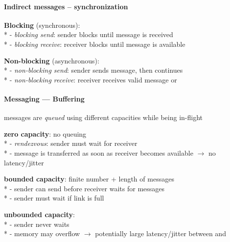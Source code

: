\paragraph{Indirect messages -- synchronization}
\begin{items}
  \item \textbf{Blocking} (synchronous): \\*
    - \emph{blocking send}: sender blocks until message is received \\*
    - \emph{blocking receive}: receiver blocks until message is available
  \item \textbf{Non-blocking} (asynchronous): \\*
    - \emph{non-blocking send}: sender sends message, then continues \\*
    - \emph{non-blocking receive}: receiver receives valid message or 
\end{items}

\paragraph{Messaging --- Buffering}
\begin{items}
  \item messages are \emph{queued} using different capacities while being in-flight
  \item \textbf{zero capacity}: no queuing \\*
    - \emph{rendezvous}: sender must wait for receiver \\*
    - message is transferred as soon as receiver becomes available \( \to \) no latency/jitter
  \item \textbf{bounded capacity}: finite number + length of messages \\*
    - sender can send before receiver waits for messages \\*
    - sender must wait if link is full
  \item \textbf{unbounded capacity}: \\*
    - sender never waits \\*
    - memory may overflow \( \to \) potentially large latency/jitter between  and 
\end{items}


